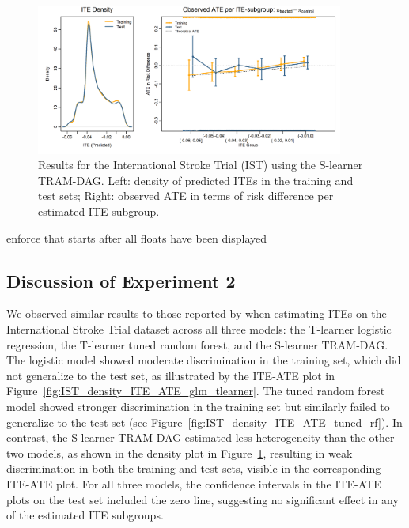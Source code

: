 \begin{figure}[htbp]
\centering
\includegraphics[width=0.9\textwidth]{img/results_IST/IST_TRAM_DAG_slearner_density_ITE_ATE.png}
\caption{Results for the International Stroke Trial (IST) using the S-learner TRAM-DAG. Left: density of predicted ITEs in the training and test sets; Right: observed ATE in terms of risk difference per estimated ITE subgroup.}
\label{fig:IST_density_ITE_ATE_TRAM_DAG}
\end{figure}


enforce that starts after all floats have been displayed
\FloatBarrier


\subsection{Discussion of Experiment 2}

We observed similar results to those reported by \citet{chen2025} when estimating ITEs on the International Stroke Trial dataset across all three models: the T-learner logistic regression, the T-learner tuned random forest, and the S-learner TRAM-DAG. The logistic model showed moderate discrimination in the training set, which did not generalize to the test set, as illustrated by the ITE-ATE plot in Figure~\ref{fig:IST_density_ITE_ATE_glm_tlearner}. The tuned random forest model showed stronger discrimination in the training set but similarly failed to generalize to the test set (see Figure~\ref{fig:IST_density_ITE_ATE_tuned_rf}). In contrast, the S-learner TRAM-DAG estimated less heterogeneity than the other two models, as shown in the density plot in Figure~\ref{fig:IST_density_ITE_ATE_TRAM_DAG}, resulting in weak discrimination in both the training and test sets, visible in the corresponding ITE-ATE plot. For all three models, the confidence intervals in the ITE-ATE plots on the test set included the zero line, suggesting no significant effect in any of the estimated ITE subgroups.

